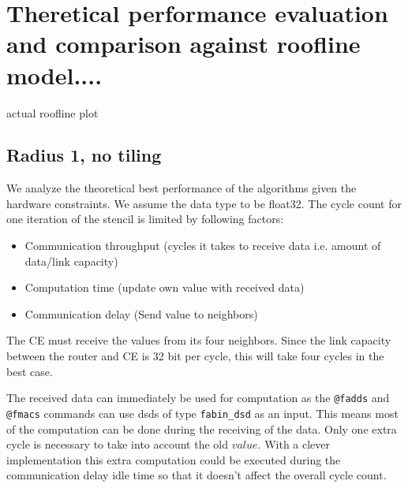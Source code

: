 \documentclass{article}
\begin{document}
        
            


\section{Theretical performance evaluation and comparison against roofline model....}
actual roofline plot
\subsection{Radius 1, no tiling}
We analyze the theoretical best performance of the algorithms given the hardware constraints.
We assume the data type to be float32.
The cycle count for one iteration of the stencil is limited by following factors:
\begin{itemize}
    \item Communication throughput (cycles it takes to receive data i.e. amount of data/link capacity)
    \item Computation time (update own value with received data)
    \item Communication delay (Send value to neighbors)
\end{itemize}
The CE must receive the values from its four neighbors. Since the link capacity between the router and CE is 32 bit per cycle, this will take four cycles in the best case.

The received data can immediately be used for computation as the \texttt{@fadds} and \texttt{@fmacs} commands can use dsds of type \texttt{fabin\_dsd} as an input. This means most of the computation can be done during the receiving of the data. Only one extra cycle is necessary to take into account the old $value$. With a clever implementation this extra computation could be executed during the communication delay idle time so that it doesn't affect the overall cycle count.
\end{document}
